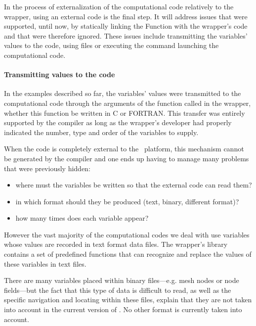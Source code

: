 
In the process of externalization of the computational code relatively to the wrapper, using an external code is the final step. It will address issues that were supported, until now, by statically linking the Function with the wrapper's code and that were therefore ignored. These issues include transmitting the variables' values to the code, using files or executing the command launching the computational code.

\paragraph{Transmitting values to the code}

In the examples described so far, the variables' values were transmitted to the computational code through the arguments of the function called in the wrapper, whether this function be written in C or FORTRAN. This transfer was entirely supported by the compiler as long as the wrapper's developer had properly indicated the number, type and order of the variables to supply.

When the code is completely external to the \OT\ platform, this mechanism cannot be generated by the compiler and one ends up having to manage many problems that were previously hidden:
\begin{itemize}
\item where must the variables be written so that the external code can read them?
\item in which format should they be produced (text, binary, different format)?
\item how many times does each variable appear?
\end{itemize}

However the vast majority of the computational codes we deal with use variables whose values are recorded in text format data files. The wrapper's library contains a set of predefined functions that can recognize and replace the values of these variables in text files.

There are many variables placed within binary files---e.g. mesh nodes or node fields---but the fact that this type of data is difficult to read, as well as the specific navigation and locating within these files, explain that they are not taken into account in the current version of \OT. No other format is currently taken into account.

